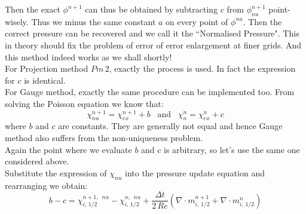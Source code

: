 Then the exact $\phi^{n+1}$ can thus be obtained by subtracting $c$ from $\phi^{n+1}_{nu}$ point-wisely. Thus we minus the same constant $a$ on every point of $\phi^{nu}$. Then the correct pressure can be recovered and we call it the ``Normalised Pressure". This in theory should fix the problem of error of error enlargement at finer grids. And this method indeed works as we shall shortly!\\

For Projection method $Pm\,2$, exactly the process is used. In fact the expression for $c$ is identical.\\

For Gauge method, exactly the same procedure can be implemented too. From solving the Poisson equation we know that:
\begin{equation}
\chi^{n+1}_{nu} = \chi^{n+1}_{ex} + b\,\,\,\text{ and }\,\,\,\chi^{n}_{n} = \chi^n_{ex} + c
\end{equation}
where $b$ and $c$ are constants. They are generally not equal and hence Gauge method also suffers from the non-uniqueness problem.\\

Again the point where we evaluate $b$ and $c$ is arbitrary, so let's use the same one considered above.\\
Substitute the expression of $\chi_{nu}$ into the pressure update equation and rearranging we obtain:
\begin{equation}
b - c = \chi^{n+1,\,\,\,nu}_{i,\,1/2} - \chi^{n,\,\,\,nu}_{i,\,1/2} + \dfrac{\Delta t}{2\,Re}(\nabla \cdot m^{n+1}_{i,\,1/2} + \nabla \cdot m^n_{i,\,1/2})
\end{equation}
